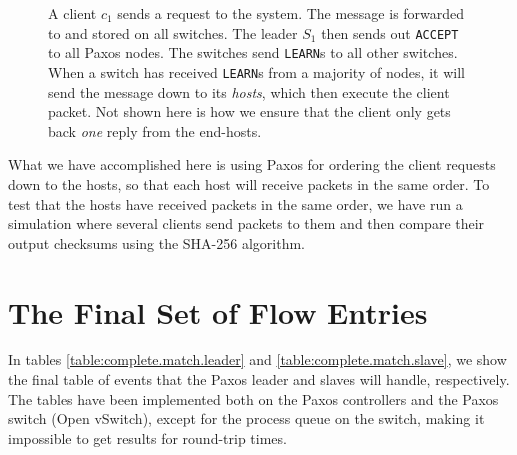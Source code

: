 \begin{figure}
  \centering
  \scriptsize
  \caption{A client $c_1$ sends a request to the system. The message is
    forwarded to and stored on all switches.  The leader $S_1$ then sends out
      \texttt{ACCEPT} to all Paxos nodes.  The switches send \texttt{LEARN}s to
      all other switches.  When a switch has received \texttt{LEARN}s from a
      majority of nodes, it will send the message down to its
      \textit{hosts}, which then execute the client packet.  Not shown here
      is how we ensure that the client only gets back \textit{one} reply
      from the end-hosts.}
  \label{flow:simple}
\end{figure}

What we have accomplished here is using Paxos for
ordering the client
requests down to the hosts, so that each host will receive packets in the
same order.  To test that the hosts have received packets in the same order,
we have run a simulation where several clients send packets to them and then
compare their output checksums using the SHA-256 algorithm.

\section{The Final Set of Flow Entries}
\label{chapter:final.flowtable}

In tables \ref{table:complete.match.leader} and
\ref{table:complete.match.slave}, we show the final table of events that the
Paxos leader and slaves will handle, respectively.
%
The tables have been implemented both on the Paxos controllers and the Paxos
switch (Open vSwitch), except for the process queue on the switch, making it
impossible to get results for round-trip times.

